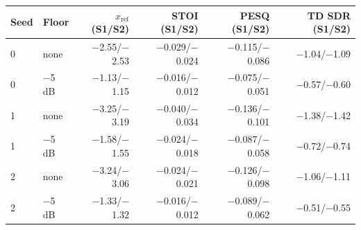 \begin{tabular}{@{}llrrrr@{}}
\toprule
Seed & Floor & $x_{\mathrm{ref}}$ (S1/S2) & STOI (S1/S2) & PESQ (S1/S2) & TD SDR (S1/S2) \\
\midrule
0 & none & $-$2.55/$-$2.53 & $-$0.029/$-$0.024 & $-$0.115/$-$0.086 & $-$1.04/$-$1.09 \\
0 & $-$5\,dB & $-$1.13/$-$1.15 & $-$0.016/$-$0.012 & $-$0.075/$-$0.051 & $-$0.57/$-$0.60 \\
1 & none & $-$3.25/$-$3.19 & $-$0.040/$-$0.034 & $-$0.136/$-$0.101 & $-$1.38/$-$1.42 \\
1 & $-$5\,dB & $-$1.58/$-$1.55 & $-$0.024/$-$0.018 & $-$0.087/$-$0.058 & $-$0.72/$-$0.74 \\
2 & none & $-$3.24/$-$3.06 & $-$0.024/$-$0.021 & $-$0.126/$-$0.098 & $-$1.06/$-$1.11 \\
2 & $-$5\,dB & $-$1.33/$-$1.32 & $-$0.016/$-$0.012 & $-$0.089/$-$0.062 & $-$0.51/$-$0.55 \\
\bottomrule
\end{tabular}
